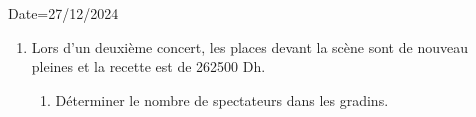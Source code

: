 \documentclass[a4paper,12pt]{article}
\begin{document}
\begin{Maquette}[Olym]{Date=27/12/2024}
\begin{exercice}
\begin{enumerate}
\anserline[5]
\item{} Lors d'un deuxième concert, les places devant la scène sont de nouveau pleines et la recette est de 262500 Dh.
\begin{enumerate}
\item{} Déterminer le nombre de spectateurs dans les gradins. 

\anserline[9]
\end{enumerate}
\end{enumerate}
\end{exercice}

\end{Maquette}
\end{document}
